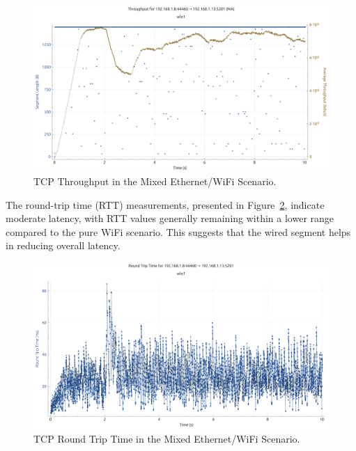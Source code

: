 \begin{enumerate}
                \begin{figure}[ht]
                    \centering
                    \includegraphics[width=0.9\columnwidth]{images/graphs/Throughput/Throughput_MIX_TCP.pdf}
                    \caption{TCP Throughput in the Mixed Ethernet/WiFi Scenario.}
                    \label{fig:throughput-mix-tcp}
                \end{figure}

                The round-trip time (RTT) measurements, presented in Figure~\ref{fig:rtt-mix-tcp}, indicate moderate latency, with RTT values generally remaining within a lower range compared to the pure WiFi scenario. 
                This suggests that the wired segment helps in reducing overall latency. \\

                \begin{figure}[ht]
                    \centering
                    \includegraphics[width=0.9\columnwidth]{images/graphs/RTT/RTT_MIX_TCP.pdf}
                    \caption{TCP Round Trip Time in the Mixed Ethernet/WiFi Scenario.}
                    \label{fig:rtt-mix-tcp}
                \end{figure}


\end{enumerate}

